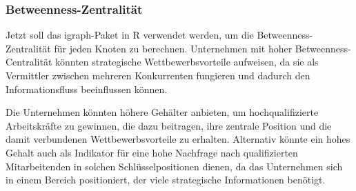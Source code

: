 \documentclass[
]{article}
\newenvironment{Shaded}{\begin{snugshade}}{\end{snugshade}}
\newcommand{\AttributeTok}[1]{\textcolor[rgb]{0.13,0.29,0.53}{#1}}
\newcommand{\CommentTok}[1]{\textcolor[rgb]{0.56,0.35,0.01}{\textit{#1}}}
\newcommand{\FunctionTok}[1]{\textcolor[rgb]{0.13,0.29,0.53}{\textbf{#1}}}
\newcommand{\NormalTok}[1]{#1}
\newcommand{\OtherTok}[1]{\textcolor[rgb]{0.56,0.35,0.01}{#1}}
\newcommand{\SpecialCharTok}[1]{\textcolor[rgb]{0.81,0.36,0.00}{\textbf{#1}}}
\newcommand{\StringTok}[1]{\textcolor[rgb]{0.31,0.60,0.02}{#1}}
\begin{document}
\begin{Shaded}
\end{Shaded}

\subsubsection{Betweenness-Zentralität}\label{betweenness-zentralituxe4t}

Jetzt soll das igraph-Paket in R verwendet werden, um die
Betweenness-Zentralität für jeden Knoten zu berechnen. Unternehmen mit
hoher Betweenness-Centralität könnten strategische Wettbewerbsvorteile
aufweisen, da sie als Vermittler zwischen mehreren Konkurrenten
fungieren und dadurch den Informationsfluss beeinflussen können.

Die Unternehmen könnten höhere Gehälter anbieten, um hochqualifizierte
Arbeitskräfte zu gewinnen, die dazu beitragen, ihre zentrale Position
und die damit verbundenen Wettbewerbsvorteile zu erhalten. Alternativ
könnte ein hohes Gehalt auch als Indikator für eine hohe Nachfrage nach
qualifizierten Mitarbeitenden in solchen Schlüsselpositionen dienen, da
das Unternehmen sich in einem Bereich positioniert, der viele
strategische Informationen benötigt.
\end{document}
